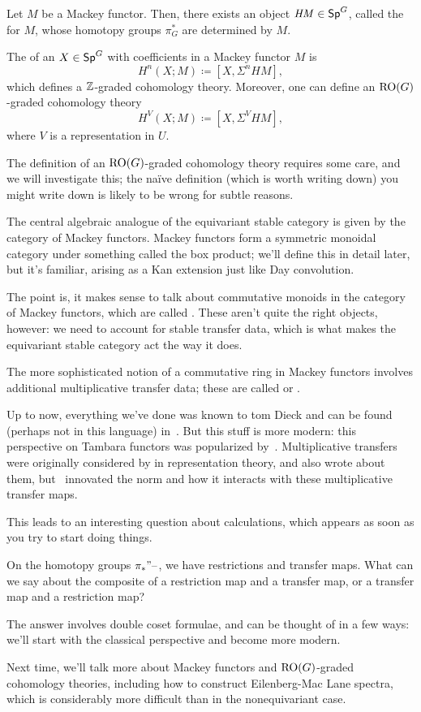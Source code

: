 Let $M$ be a Mackey functor. Then, there exists an object $\mathit{HM}\in\mathsf{Sp}^G$, called the  for $M$, whose homotopy groups $\pi_G^*$ are determined by $M$.
\begin{defn}
The  of an $X\in\mathsf{Sp}^G$ with coefficients in a Mackey functor $M$ is
\[H^n(X;M)\coloneqq [X, \Sigma^n \mathit{HM}],\]
which defines a $\mathbb Z$-graded cohomology theory. Moreover, one can define an $\mathrm{RO}(G)$-graded cohomology theory
\[H^V(X;M)\coloneqq [X, \Sigma^V \mathit{HM}],\]
where $V$ is a representation in $U$.
\end{defn}
The definition of an $\mathrm{RO}(G)$-graded cohomology theory requires some care, and we will investigate this; the naïve
definition (which is worth writing down) you might write down is likely to be wrong for subtle reasons.

The central algebraic analogue of the equivariant stable category is given by the category of Mackey functors.
Mackey functors form a symmetric monoidal category under something called the box product; we'll define this in
detail later, but it's familiar, arising as a Kan extension just like Day convolution.

The point is, it makes sense to talk about commutative monoids in the category of Mackey functors, which are called
. These aren't quite the right objects, however: we need to account for stable transfer data,
which is what makes the equivariant stable category act the way it does.

The more sophisticated notion of a commutative ring in Mackey functors involves additional multiplicative transfer
data; these are called  or .

Up to now, everything we've done was known to tom Dieck and can be found (perhaps not in this language)
in~\cite{LMS}. But this stuff is more modern: this perspective on Tambara functors was popularized by~\cite{HHR}.
Multiplicative transfers were originally considered by  in representation theory, and
 also wrote about them, but~\cite{HHR} innovated the norm and how it interacts with these
multiplicative transfer maps.

This leads to an interesting question about calculations, which appears as soon as you try to start doing things.
\begin{ques}
On the homotopy groups $\pi_*"\text{--}$, we have restrictions and transfer maps. What can we say about the composite of
a restriction map and a transfer map, or a transfer map and a restriction map?
\end{ques}
The answer involves double coset formulae, and can be thought of in a few ways: we'll start with the classical
perspective and become more modern.

Next time, we'll talk more about Mackey functors and $\mathrm{RO}(G)$-graded cohomology theories, including how to
construct Eilenberg-Mac Lane spectra, which is considerably more difficult than in the nonequivariant case.
